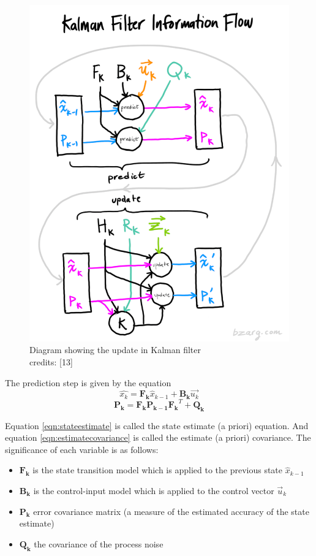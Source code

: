 \documentclass[12pt,twocolumn,letterpaper]{article}
\begin{document}
\begin{figure}
\includegraphics[scale=0.3]{kalflow}
\caption{Diagram showing the update in Kalman filter\\ credits: [13]}
\end{figure}

The prediction step is given by the equation
\begin{equation}
\hat{x_k} = \mathbf{F_k} \hat{x}_{k-1} + \mathbf{B_k} \vec{u_k}
\label{eqn:stateestimate}
\end{equation}
\begin{equation}
\mathbf{P_k} = \mathbf{F_k} \mathbf{P_{k-1}} \mathbf{F_k}^T + \mathbf{Q_k}
\label{eqn:estimatecovariance}
\end{equation}

Equation \ref{eqn:stateestimate} is called the state estimate (a priori) equation. And equation \ref{eqn:estimatecovariance} is called the estimate (a priori) covariance. The significance of each variable is as follows:
\begin{itemize}
\item $\mathbf{F_k}$ is the state transition model which is applied to the previous state $\hat{x}_{k−1}$
\item $\mathbf{B_k}$ is the control-input model which is applied to the control vector $\vec{u}_k$
\item $\mathbf{P_k}$ error covariance matrix (a measure of the estimated accuracy of the state estimate)
\item $\mathbf{Q_k}$ the covariance of the process noise
\end{itemize}
\end{document}
